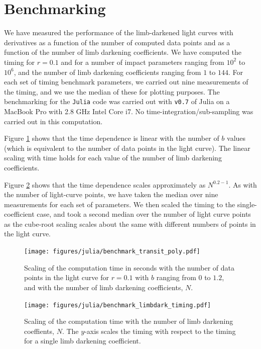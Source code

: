 \documentclass[modern]{aastex61}
\begin{document}
\section{Benchmarking}\label{sec:benchmark}

We have measured the performance of the limb-darkened light curves
with derivatives as a function of the number of computed data points
and as a function of the number of limb darkening coefficients.  We
have computed the timing for $r=0.1$ and for a number of impact
parameters ranging from $10^2$ to $10^6$, and the number of limb darkening
coefficients ranging from $1$ to $144$.  For each set of timing benchmark
parameters, we carried out nine measurements  of the timing, and
we use the median of these for plotting purposes.  The benchmarking
for the \texttt{Julia} code was carried out with \texttt{v0.7} of
Julia on a MacBook Pro with 2.8 GHz Intel Core i7.
No time-integration/sub-sampling was carried out in this computation. 

Figure \ref{fig:ncoeff} shows that the time dependence is linear with the
number of $b$ values (which is equivalent to the number of data points
in the light curve).  The linear scaling with time holds for each value of
the number of limb darkening coefficients.

Figure \ref{fig:nlimb} shows that the time dependence scales approximately
as $N^{0.2-1}$.  As with the number of light-curve points, we have taken
the median over nine measurements for each set of parameters.  We then
scaled the timing to the single-coefficient case, and took a second
median over the number of light curve points as the cube-root scaling scales
about the same with different numbers of points in the light curve.

\begin{figure}
    \begin{centering}
    \texttt{[image: figures/julia/benchmark\_transit\_poly.pdf]}
    \caption{Scaling of the computation time in seconds with the number of
    data points in the light curve for $r=0.1$ with $b$ ranging from $0$ to $1.2$,
    and with the number of limb darkening coefficients, $N$. 
    \label{fig:ncoeff}}
    \end{centering}
\end{figure}

\begin{figure}
    \begin{centering}
    \texttt{[image: figures/julia/benchmark\_limbdark\_timing.pdf]}
    \caption{Scaling of the computation time with the number of
    limb darkening coeffients, $N$.  The $y$-axis scales the timing with respect
    to the timing for a single limb darkening coefficient. 
    \label{fig:nlimb}}
    \end{centering}
\end{figure}
\end{document}
